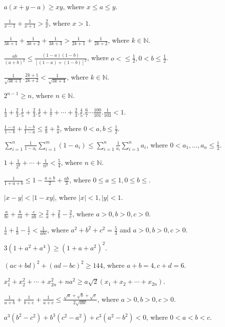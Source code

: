 \item $a(x + y - a)\geq xy$, where $x\leq a\leq y$.
\item $\frac{1}{x - 1} + \frac{1}{x + 1} > \frac{2}{x}$, where $x > 1$.
\item $\frac{1}{3k + 1} + \frac{1}{3k + 2} + \frac{1}{3k + 3} > \frac{1}{2k + 1} + \frac{1}{2k + 2}$, where $k\in\mathbb{N}$.
\item $\frac{ab}{(a + b)^2}\leq \frac{(1 - a)(1 - b)}{[(1 - a) + (1 - b)]^2}$, where $o<\leq\frac{1}{2}, 0<b\leq\frac{1}{2}$.
\item $\frac{1}{\sqrt{3k + 1}}.\frac{2k + 1}{2k + 2} < \frac{1}{\sqrt{3k + 4}}$, where $k\in\mathbb{N}$.
\item $2^{n - 1}\geq n$, where $n\in\mathbb{N}$.
\item $\frac{1}{3} + \frac{2}{3}.\frac{1}{5} + \frac{2}{3}.\frac{4}{5} + \frac{1}{7} + \cdots +
  \frac{2}{3}.\frac{4}{5}.\frac{6}{7}\cdots \frac{100}{101}.\frac{1}{103} < 1$.
\item $\frac{1 - a}{1 - b} + \frac{1 - b}{1 - a}\leq \frac{a}{b} + \frac{b}{a}$, where $0 < a, b\leq \frac{1}{2}$.
\item $\displaystyle\sum_{i=1}^n\frac{1}{1 - a_i}\sum_{i=1}^m(1 - a_i)\leq \sum_{i=1}^n\frac{1}{a_i}\sum_{i=1}^na_i$, where $0 < a_1, \ldots,
  a_n\leq \frac{1}{2}$.
\item $1 + \frac{1}{2^3} + \cdots + \frac{1}{n^3} < \frac{5}{4}$, where $n\in\mathbb{N}$.
\item $\frac{1}{1 + a + b}\leq 1 - \frac{a + b}{2} + \frac{ab}{3}$, where $0\leq a\leq 1, 0\leq b\leq$.
\item $|x - y| < |1 - xy|$, where $|x| < 1, |y| < 1$.
\item $\frac{a}{bc} + \frac{b}{ca} + \frac{c}{ab}\geq \frac{2}{a} + \frac{2}{b} - \frac{2}{c}$, where $a > 0, b > 0, c > 0$.
\item $\frac{1}{a} + \frac{1}{b} - \frac{1}{c} < \frac{1}{abc}$, where $a^2 + b^2 + c^2 = \frac{5}{3}$ and $a > 0, b > 0, c > 0$.
\item $3(1 + a^2 + a^4)\geq (1 + a + a^2)^2$.
\item $(ac + bd)^2 + (ad - bc)^2\geq 144$, where $a + b = 4, c + d = 6$.
\item $x_1^2 + x_2^2 + \cdots + x_{2n}^2 + na^2 \geq a\sqrt{2}(x_1 + x_2 + \cdots + x_{2n})$.
\item $\frac{1}{a + b} + \frac{1}{b + c} + \frac{1}{a + c}\leq \frac{\sqrt{a} + \sqrt{b} + \sqrt{c}}{2\sqrt{abc}}$, where $a > 0, b
  > 0, c > 0$.
\item $a^3(b^2 - c^2) + b^3(c^2 - a^2) + c^3(a^2 - b^2) < 0$, where $0 < a < b < c$.
